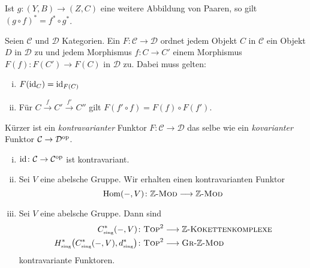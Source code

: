 \begin{bemerkung}
	Ist $g \colon (Y,B) \to (Z,C)$ eine weitere Abbildung von Paaren, so gilt $(g \circ f)^* = f^* \circ g^*$.
\end{bemerkung}

\begin{definition}[{name=[kontravarianter Funktor]}]
	Seien $\mathcal{C}$ und $\mathcal{D}$ Kategorien. Ein   $F \colon \mathcal{C} \to \mathcal{D}$ ordnet jedem Objekt $C$ in $\mathcal{C}$ ein Objekt
	$D$ in $\mathcal{D}$ zu und jedem Morphismus $f \colon C \to C'$ einem Morphismus $F(f) \colon F(C') \to F(C)$ in $\mathcal{D}$ zu. Dabei muss gelten:
	\begin{enumerate}[i)]
		\item $F(\operatorname{id}_C)= \operatorname{id}_{F(C)}$
		\item Für $C \xrightarrow{f} C' \xrightarrow{f'}C''$ gilt $F(f' \circ f) = F(f) \circ F(f')$. 
	\end{enumerate}
	Kürzer ist ein \emph{kontravarianter} Funktor $F \colon \mathcal{C} \to \mathcal{D}$ das selbe wie ein \emph{kovarianter} Funktor 
	$\mathcal{C} \to \mathcal{D}^{\mathrm{op}}$.
\end{definition}

\begin{beispiel}
	\begin{enumerate}[i)]
		\item $\operatorname{id} \colon \mathcal{C} \to \mathcal{C}^{\mathrm{op}}$ ist kontravariant.
		\item Sei $V$ eine abelsche Gruppe. Wir erhalten einen kontravarianten Funktor
		\[
			\operatorname{Hom}(-,V) \colon \mathbb{Z}\text{-}\textsc{Mod}  \longrightarrow \mathbb{Z}\text{-}\textsc{Mod}
		\]
		\item Sei $V$ eine abelsche Gruppe. Dann sind 
		\begin{align}
			C_\sing^*(-,V) &\colon \TOP^2 \longrightarrow \mathbb{Z}\text{-}\textsc{Kokettenkomplexe}  \\
			H^*_\sing \enbrace*{C_\sing^*(-,V),d_\sing^*} &\colon \TOP^2 \longrightarrow \textsc{Gr}\text{-}\mathbb{Z}\text{-}\MOD   
		\end{align}
		kontravariante Funktoren.
	\end{enumerate}
\end{beispiel}


